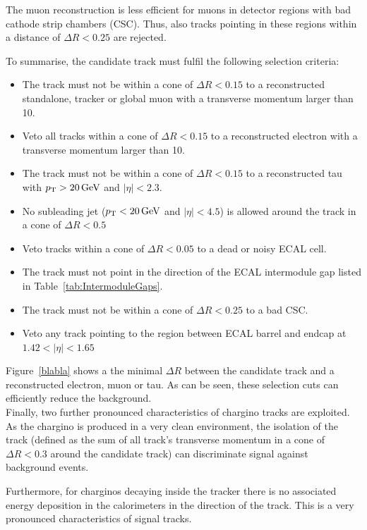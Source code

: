 The muon reconstruction is less efficient for muons in detector regions with bad cathode strip chambers (CSC).
Thus, also tracks pointing in these regions within a distance of $\Delta R<0.25$ are rejected.


To summarise, the candidate track must fulfil the following selection criteria:
\begin{itemize}
\renewcommand{\labelitemi}{\footnotesize{\ding{118}}}
\item The track must not be within a cone of $\Delta R<0.15$ to a reconstructed standalone, tracker or global muon with a transverse momentum larger than 10\gev.
\item Veto all tracks within a cone of $\Delta R<0.15$ to a reconstructed electron with a transverse momentum larger than 10\gev.
\item The track must not be within a cone of $\Delta R<0.15$ to a reconstructed tau with $p_{\text{T}}>20\,\text{Ge}\kern-0.06667em\text{V}$ and $|\eta|<2.3$.
\item No subleading jet ($p_{\text{T}}<20\,\text{Ge}\kern-0.06667em\text{V}$ and $|\eta|<4.5$) is allowed around the track in a cone of $\Delta R< 0.5$
\item Veto tracks within a cone of $\Delta R<0.05$ to a dead or noisy ECAL cell.
\item The track must not point in the direction of the ECAL intermodule gap listed in Table~\ref{tab:IntermoduleGaps}.
\item The track must not be within a cone of $\Delta R<0.25$ to a bad CSC.
\item Veto any track pointing to the region between ECAL barrel and endcap at $1.42<|\eta|<1.65$
\end{itemize}
Figure~\ref{blabla} shows a the minimal $\Delta R$ between the candidate track and a reconstructed electron, muon or tau.
As can be seen, these selection cuts can efficiently reduce the \WJets background.\\

Finally, two further pronounced characteristics of chargino tracks are exploited.
As the chargino is produced in a very clean environment, the isolation of the track (defined as the sum of all track's transverse momentum in a cone of $\Delta R < 0.3$ around the candidate track) can discriminate signal against background events.

Furthermore, for charginos decaying inside the tracker there is no associated energy deposition in the calorimeters in the direction of the track.
This is a very pronounced characteristics of signal tracks.

